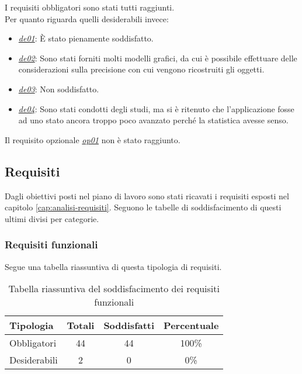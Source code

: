 I requisiti obbligatori sono stati tutti raggiunti.\\
Per quanto riguarda quelli desiderabili invece:
\begin{itemize}
	\item \underline{\textit{de01}}: È stato pienamente soddisfatto.
	\item \underline{\textit{de02}}: Sono stati forniti molti modelli grafici, da cui è possibile effettuare delle considerazioni sulla precisione con cui vengono ricostruiti gli oggetti.
	\item \underline{\textit{de03}}: Non soddisfatto.
	\item \underline{\textit{de04}}: Sono stati condotti degli studi, ma si è ritenuto che l'applicazione fosse ad uno stato ancora troppo poco avanzato perché la statistica avesse senso.
\end{itemize}
Il requisito opzionale \underline{\textit{op01}} non è stato raggiunto.

\subsection{Requisiti}
Dagli obiettivi posti nel piano di lavoro sono stati ricavati i requisiti esposti nel capitolo \ref{cap:analisi-requisiti}. Seguono le tabelle di soddisfacimento di questi ultimi divisi per categorie.

\subsubsection{Requisiti funzionali}
Segue una tabella riassuntiva di questa tipologia di requisiti.
\begin{table}[H]
	\begin{center}
	  \begin{tabular}{ l  c  c  c }
	    \hline
	    \textbf{Tipologia} & \textbf{Totali} & \textbf{Soddisfatti} & \textbf{Percentuale} \\ \hline
	    Obbligatori & 44 & 44 & 100\%\\ \hline
	    Desiderabili & 2 & 0 & 0\%\\
	    \hline
	  \end{tabular}
	\end{center}
	\caption{Tabella riassuntiva del soddisfacimento dei requisiti funzionali}
\end{table}

